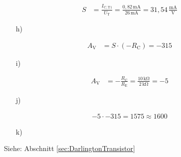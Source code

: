 {    \begin{align*}
      S &= \frac{I_\mathrm{C,T1}}{U_\mathrm{T}} = \frac{0,82\,\mathrm{mA}}{26\,\mathrm{mA}} = 31,54\, \frac{\mathrm{mA}}{\mathrm{V}}
    \end{align*}
    \begin{itemize}
      \item[h)]
    \end{itemize}
    \begin{align*}
      A_\mathrm{V} &= S \cdot (-R_\mathrm{C}) = -315
    \end{align*}
    \begin{itemize}
      \item[i)]
    \end{itemize}
    \begin{align*}
      A_\mathrm{V} &= -\frac{R_\mathrm{C}}{R_\mathrm{E}} = \frac{10\,\mathrm{k\Omega}}{2\,\mathrm{k\Omega}} = -5
    \end{align*}
    \begin{itemize}
      \item[j)]
    \end{itemize}
    \begin{align*}
      -5 \cdot -315 = 1575 \approx 1600
    \end{align*}
    \begin{itemize}
      \item[k)]
    \end{itemize}
    \begin {figure} [H]
        \centering
        
        \label{fig:LsgKlausurVerbundverstaerker}
    \end {figure}
    Siehe: Abschnitt \ref{sec:DarlingtonTransistor}
    

    
    
    
    
}
